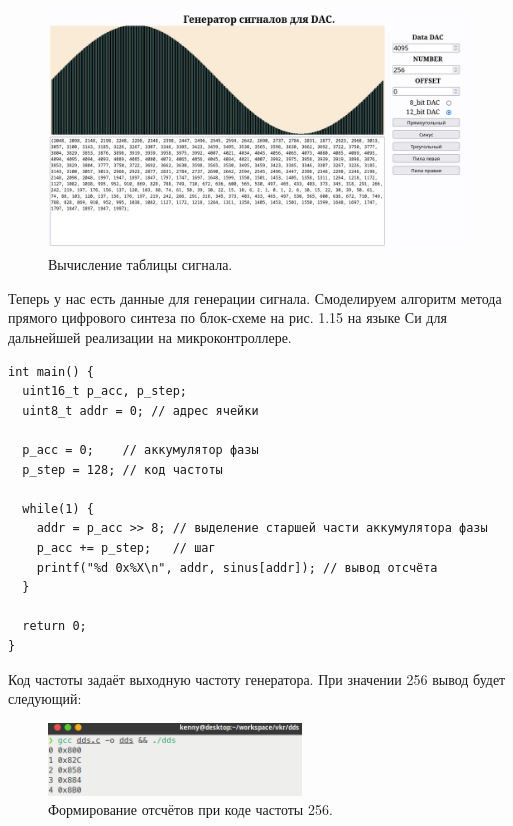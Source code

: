 	\begin{figure}[H]
    \centering
    \includegraphics[width=1\textwidth]{../image/lut.png}
    \caption{Вычисление таблицы сигнала.}
	\end{figure}
	
	Теперь у нас есть данные для генерации сигнала. Смоделируем алгоритм метода прямого цифрового синтеза по блок-схеме на рис. 1.15 на языке Си для дальнейшей реализации на микроконтроллере.

\begin{code}
\begin{verbatim}
int main() {
  uint16_t p_acc, p_step;
  uint8_t addr = 0; // адрес ячейки

  p_acc = 0;    // аккумулятор фазы
  p_step = 128; // код частоты

  while(1) {
    addr = p_acc >> 8; // выделение старшей части аккумулятора фазы
    p_acc += p_step;   // шаг
    printf("%d 0x%X\n", addr, sinus[addr]); // вывод отсчёта
  }

  return 0;
}
\end{verbatim}
\end{code}

	
	Код частоты задаёт выходную частоту генератора. При значении 256 вывод будет следующий:
	
\begin{figure}[H]
    \centering
    \includegraphics[width=0.6\textwidth]{../image/dds256.png}
    \caption{Формирование отсчётов при коде частоты 256.}
\end{figure}
	
